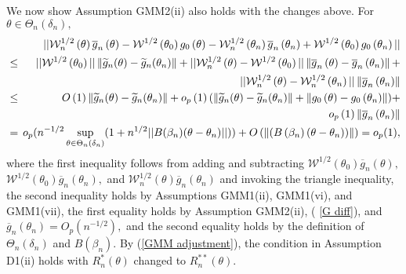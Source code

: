 \documentclass[12pt,thmsb,titlepage,final,oneside,letterpaper]{article}
\begin{document}
We now show Assumption GMM2(ii) also holds with the changes above. For $%
\theta \in \Theta _{n}(\delta _{n}),$%
\begin{eqnarray}
&&\hspace{-0.08in}||\mathcal{W}_{n}^{1/2}\left( \theta \right) \overline{g}%
_{n}\left( \theta \right) -\mathcal{W}^{1/2}\left( \theta _{0}\right)
g_{0}\left( \theta \right) -\mathcal{W}_{n}^{1/2}\left( \theta _{n}\right) 
\overline{g}_{n}\left( \theta _{n}\right) +\mathcal{W}^{1/2}\left( \theta
_{0}\right) g_{0}\left( \theta _{n}\right) ||  \notag \\
&\leq &\hspace{-0.08in}||\mathcal{W}^{1/2}\left( \theta _{0}\right)
||\left\Vert \widetilde{g}_{n}(\theta )-\widetilde{g}_{n}(\theta
_{n})\right\Vert +||\mathcal{W}_{n}^{1/2}\left( \theta \right) -\mathcal{W}%
^{1/2}\left( \theta _{0}\right) ||\left\Vert \overline{g}_{n}\left( \theta
\right) -\overline{g}_{n}\left( \theta _{n}\right) \right\Vert +  \notag \\
&&\hspace{-0.08in}||\mathcal{W}_{n}^{1/2}\left( \theta \right) -\mathcal{W}%
_{n}^{1/2}\left( \theta _{n}\right) ||\left\Vert \overline{g}_{n}\left(
\theta _{n}\right) \right\Vert  \notag \\
&\leq &\hspace{-0.08in}O\left( 1\right) \left\Vert \widetilde{g}_{n}(\theta
)-\widetilde{g}_{n}(\theta _{n})\right\Vert +o_{p}\left( 1\right)
(\left\Vert \widetilde{g}_{n}(\theta )-\widetilde{g}_{n}(\theta
_{n})\right\Vert +\left\Vert g_{0}\left( \theta \right) -g_{0}\left( \theta
_{n}\right) \right\Vert )+  \notag \\
&&\hspace{-0.08in}o_{p}\left( 1\right) \left\Vert \overline{g}_{n}\left(
\theta _{n}\right) \right\Vert  \label{GMM adjustment} \\
&=&\hspace{-0.08in}o_{p}(n^{-1/2}\sup_{\theta \in \Theta _{n}(\delta
_{n})}(1+n^{1/2}||B(\beta _{n})(\theta -\theta _{n})||))+O\left( \left\Vert
\left( B\left( \beta _{n}\right) \left( \theta -\theta _{n}\right) \right)
\right\Vert \right) =o_{p}(1),  \notag
\end{eqnarray}%
where the first inequality follows from adding and subtracting $\mathcal{W}%
^{1/2}\left( \theta _{0}\right) \overline{g}_{n}\left( \theta \right) ,$%
\linebreak $\mathcal{W}^{1/2}\left( \theta _{0}\right) \overline{g}%
_{n}\left( \theta _{n}\right) ,$ and $\mathcal{W}_{n}^{1/2}\left( \theta
\right) \overline{g}_{n}\left( \theta _{n}\right) $ and invoking the
triangle inequality, the second inequality holds by Assumptions GMM1(ii),
GMM1(vi), and GMM1(vii), the first equality holds by Assumption GMM2(ii), (%
\ref{G diff}), and $\overline{g}_{n}\left( \theta _{n}\right)
=O_{p}(n^{-1/2}),$ and the second equality holds by the definition of $%
\Theta _{n}(\delta _{n})$ and $B(\beta _{n})$. By (\ref{GMM adjustment}),
the condition in Assumption D1(ii) holds with $R_{n}^{\ast }(\theta )$
changed to $R_{n}^{\ast \ast }(\theta ).$
\end{document}
